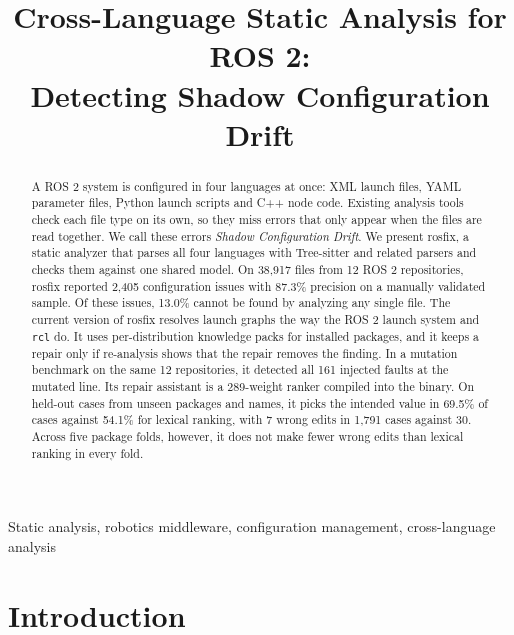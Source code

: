 \documentclass[conference]{IEEEtran}
\newcommand{\code}[1]{\texttt{#1}}
\begin{document}
\title{Cross-Language Static Analysis for ROS 2:\\Detecting Shadow Configuration Drift}

\author{
}

\maketitle

\begin{abstract}
A ROS 2 system is configured in four languages at once: XML launch files, YAML parameter files,
Python launch scripts and C++ node code. Existing analysis tools check each file type on its own,
so they miss errors that only appear when the files are read together. We call these errors
\emph{Shadow Configuration Drift}. We present rosfix, a static analyzer that parses all four
languages with Tree-sitter and related parsers and checks them against one shared model. On
38,917 files from 12 ROS 2 repositories, rosfix reported 2,405 configuration issues with 87.3\%
precision on a manually validated sample. Of these issues, 13.0\% cannot be found by analyzing
any single file. The current version of rosfix resolves launch graphs the way the ROS 2 launch
system and \code{rcl} do. It uses per-distribution knowledge packs for installed packages, and it
keeps a repair only if re-analysis shows that the repair removes the finding. In a mutation
benchmark on the same 12 repositories, it detected all 161 injected faults at the mutated line.
Its repair assistant is a 289-weight ranker compiled into the binary. On held-out cases from
unseen packages and names, it picks the intended value in 69.5\% of cases against 54.1\% for
lexical ranking, with 7 wrong edits in 1,791 cases against 30. Across five package folds,
however, it does not make fewer wrong edits than lexical ranking in every fold.
\end{abstract}

\begin{IEEEkeywords}
Static analysis, robotics middleware, configuration management, cross-language analysis
\end{IEEEkeywords}

\section{Introduction}
\end{document}
